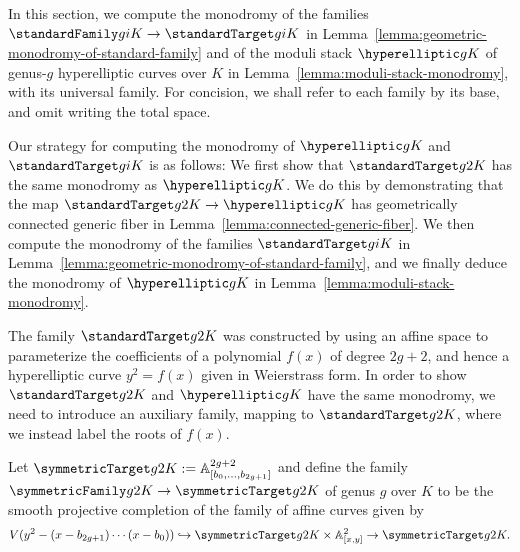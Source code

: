 In this section, we compute the monodromy of the families $\standardFamily g i K \to \standardTarget g i K$ 
in Lemma~\ref{lemma:geometric-monodromy-of-standard-family}
and
of the moduli stack $\hyperelliptic g K$ of genus-$g$ hyperelliptic curves over $K$
in Lemma~\ref{lemma:moduli-stack-monodromy}, with its universal family. For concision, we shall refer to each family by its base, and omit writing the total space. 

Our strategy for computing the monodromy of $\hyperelliptic g K$ and $\standardTarget g i K$ is as follows: We first show that $\standardTarget g 2 K$ has the same monodromy
as $\hyperelliptic g K$.
We do this by demonstrating that the map $\standardTarget g 2 K \rightarrow \hyperelliptic g K$ has geometrically connected generic fiber
in Lemma~\ref{lemma:connected-generic-fiber}.
We then compute the monodromy of the families $\standardTarget g i K$ in Lemma~\ref{lemma:geometric-monodromy-of-standard-family},
and we finally deduce the monodromy of $\hyperelliptic g K$ in Lemma~\ref{lemma:moduli-stack-monodromy}.

The family $\standardTarget g 2 K$ was constructed by using an affine space to parameterize the coefficients of a polynomial $f(x)$ of degree $2g+2$, and hence a hyperelliptic curve $y^2 = f(x)$ given in Weierstrass form. In order to show $\standardTarget g 2 K$ and $\hyperelliptic g K$ have the same monodromy,
we need to introduce an auxiliary family, mapping to $\standardTarget g 2 K$, where we instead label the roots of $f(x)$.

\begin{definition}
	\label{definition:symmetric-families}
	Let $\symmetricTarget g 2 K := \mathbb A^{2g+2}_{[b_0, \ldots, b_{2g+1}]}$
and define the family $\symmetricFamily g 2 K \rightarrow \symmetricTarget g 2 K$ of genus $g$ over $K$
to be the smooth projective completion of the family of affine curves given by 
\[
	V(y^2 - (x - b_{2g+1}) \cdots (x -b_0)) \hookrightarrow \symmetricTarget g 2 K \times \mathbb A^2_{[x,y]} \rightarrow \symmetricTarget g 2 K. \\
\]
\end{definition}

